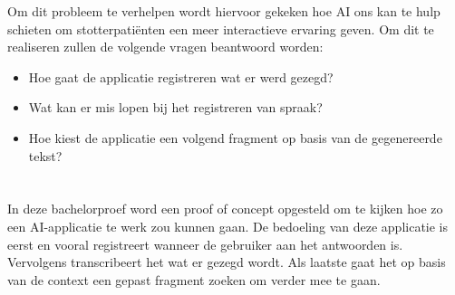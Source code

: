 Om dit probleem te verhelpen wordt hiervoor gekeken hoe AI ons kan te hulp schieten om stotterpatiënten een meer interactieve ervaring geven. Om dit te realiseren zullen de volgende vragen beantwoord worden:
\begin{itemize}
    \item Hoe gaat de applicatie registreren wat er werd gezegd?
    \item Wat kan er mis lopen bij het registreren van spraak?
    \item Hoe kiest de applicatie een volgend fragment op basis van de gegenereerde tekst?
\end{itemize}


\section{}%
\label{sec:onderzoeksdoelstelling}

In deze bachelorproef word een proof of concept opgesteld om te kijken hoe zo een AI-applicatie te werk zou kunnen gaan. De bedoeling van deze applicatie is eerst en vooral registreert wanneer de gebruiker aan het antwoorden is. Vervolgens transcribeert het wat er gezegd wordt. Als laatste gaat het op basis van de context een gepast fragment zoeken om verder mee te gaan.


\section{}%
\label{sec:opzet-bachelorproef}



